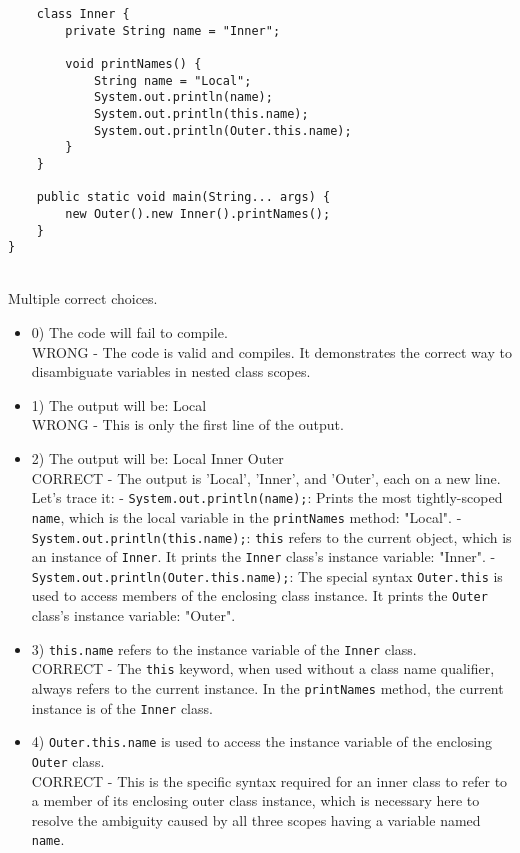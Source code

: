 \documentclass[12pt]{article}
\begin{document}
\begin{enumerate}[label=(\arabic*)]
\begin{verbatim}
    class Inner {
        private String name = "Inner";

        void printNames() {
            String name = "Local";
            System.out.println(name);
            System.out.println(this.name);
            System.out.println(Outer.this.name);
        }
    }

    public static void main(String... args) {
        new Outer().new Inner().printNames();
    }
}
\end{verbatim}
\\ \noindent Multiple correct choices. 
\begin{itemize}
\item 0) The code will fail to compile.
 \\ 
WRONG - The code is valid and compiles. It demonstrates the correct way to disambiguate variables in nested class scopes.

\item 1) The output will be: Local
 \\ 
WRONG - This is only the first line of the output.

\item 2) The output will be: Local Inner Outer
 \\ 
CORRECT - The output is 'Local', 'Inner', and 'Outer', each on a new line. Let's trace it:
- \verb|System.out.println(name);|: Prints the most tightly-scoped \verb|name|, which is the local variable in the \verb|printNames| method: "Local".
- \verb|System.out.println(this.name);|: \verb|this| refers to the current object, which is an instance of \verb|Inner|. It prints the \verb|Inner| class's instance variable: "Inner".
- \verb|System.out.println(Outer.this.name);|: The special syntax \verb|Outer.this| is used to access members of the enclosing class instance. It prints the \verb|Outer| class's instance variable: "Outer".

\item 3) \verb|this.name| refers to the instance variable of the \verb|Inner| class.
 \\ 
CORRECT - The \verb|this| keyword, when used without a class name qualifier, always refers to the current instance. In the \verb|printNames| method, the current instance is of the \verb|Inner| class.

\item 4) \verb|Outer.this.name| is used to access the instance variable of the enclosing \verb|Outer| class.
 \\ 
CORRECT - This is the specific syntax required for an inner class to refer to a member of its enclosing outer class instance, which is necessary here to resolve the ambiguity caused by all three scopes having a variable named \verb|name|.


\end{itemize}
\end{enumerate}
\end{document}
